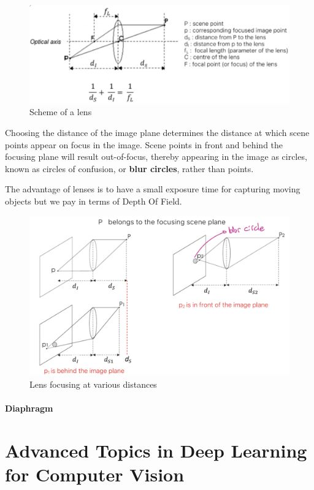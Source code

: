 \documentclass{article}
\begin{document}
\begin{figure}[htbp]
  \centering
  \includegraphics[width=0.7\linewidth]{./img/lens.jpg}
  \caption{Scheme of a lens}
  \label{fig:lens}
\end{figure}

Choosing the distance of the image plane determines the distance at which scene points appear on focus in the image.
Scene points in front and behind the focusing plane will result out-of-focus, thereby appearing in the image as circles, known as circles of confusion, or \textbf{blur circles}, rather than points.

The advantage of lenses is to have a small exposure time for capturing moving objects but we pay in terms of Depth Of Field.

\begin{figure}[htbp]
  \centering
  \includegraphics[width=0.7\linewidth]{./img/lens_focus.jpg}
  \caption{Lens focusing at various distances}
  \label{fig:lens_focus}
\end{figure}

\paragraph{Diaphragm}

\section{Advanced Topics in Deep Learning for Computer Vision}
\end{document}
